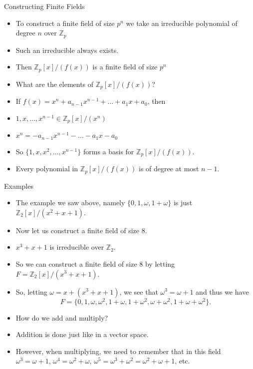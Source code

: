 \documentclass[ %
 10pt, xcolor={dvipsnames,svgnames,x11names,hyperref},
   hyperref={colorlinks=true,citecolor=green,linkcolor=DarkRed,urlcolor=ProcessBlue,anchorcolor=blue}
  ]{beamer}
\newenvironment{stepitemize}{\begin{itemize}[<+->]}{\end{itemize} }
\newcommand{\Z}{\mathbb{Z}}
\begin{document}
\begin{frame}{Constructing Finite Fields}
\begin{stepitemize}
    \item To construct a finite field of size $p^n$ we take an irreducible polynomial of degree $n$ over $\Z_p$
    \item Such an irreducible always exists.
    \item Then $\Z_p[x]/(f(x))$ is a finite field of size $p^n$
    \item What are the elements of $\Z_p[x]/(f(x))$?
    \item If $f(x)= x^n+a_{n-1}x^{n-1}+\dots+a_1x+a_0$, then
    \item $1, x, \dots, x^{n-1} \in \Z_p[x]/(x^n)$
    \item $x^n=-a_{n-1}x^{n-1}-\dots-a_1x-a_0$
    \item So $\{1, x, x^2, \dots, x^{n-1}\}$ forms a basis for $\Z_p[x]/(f(x))$.
    \item Every polynomial in $\Z_p[x]/(f(x))$ is of degree at most $n-1$.
\end{stepitemize}
\end{frame}

\begin{frame}{Examples}
\begin{stepitemize}
\item The example we saw above, namely $\{0,1,\omega, 1+\omega\}$ is just $\Z_2[x]/(x^2+x+1)$.
    \item Now let us construct a finite field of size $8$.
    \item $x^3+x+1$ is irreducible over $\Z_2$.
    \item So we can construct a finite field of size $8$ by letting $F= \Z_2[x]/(x^3+x+1)$.

    \item So, letting $\omega = x+(x^3+x+1)$, we see that $\omega^3=\omega+1$ and thus we have
    $$F = \{0,1, \omega, \omega ^2, 1+\omega, 1+\omega^2, \omega+\omega^2, 1+\omega+\omega^2\}.$$
    \item How do we add and multiply?
    \item Addition is done just like in a vector space. \item However, when multiplying, we need to remember that in this field $\omega^3=\omega+1$, $\omega^4=\omega^2+\omega$, $\omega^5 = \omega^3+\omega^2= \omega^2+\omega+1$, etc.
\end{stepitemize}
\end{frame}
\end{document}
